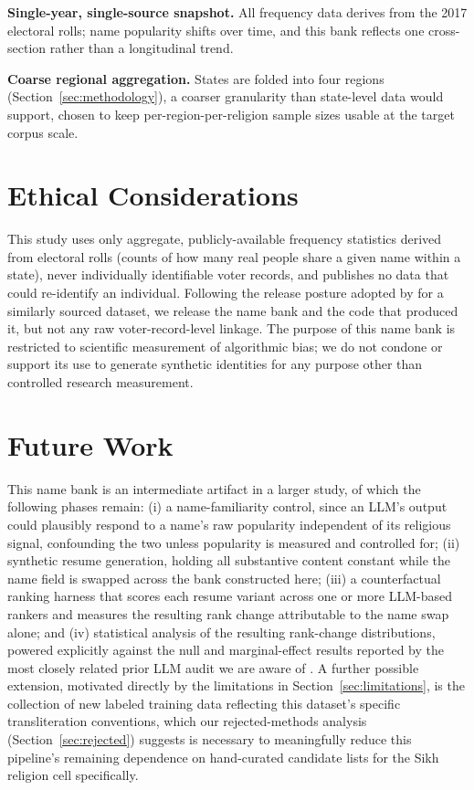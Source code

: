 \documentclass[11pt]{article}
\begin{document}
\textbf{Single-year, single-source snapshot.} All frequency data derives from the 2017 electoral rolls; name popularity shifts over time, and this bank reflects one cross-section rather than a longitudinal trend.

\textbf{Coarse regional aggregation.} States are folded into four regions (Section~\ref{sec:methodology}), a coarser granularity than state-level data would support, chosen to keep per-region-per-religion sample sizes usable at the target corpus scale.

\section{Ethical Considerations}
\label{sec:ethics}

This study uses only aggregate, publicly-available frequency statistics derived from electoral rolls (counts of how many real people share a given name within a state), never individually identifiable voter records, and publishes no data that could re-identify an individual. Following the release posture adopted by \citet{vahini2022} for a similarly sourced dataset, we release the name bank and the code that produced it, but not any raw voter-record-level linkage. The purpose of this name bank is restricted to scientific measurement of algorithmic bias; we do not condone or support its use to generate synthetic identities for any purpose other than controlled research measurement.

\section{Future Work}
\label{sec:future-work}

This name bank is an intermediate artifact in a larger study, of which the following phases remain: (i) a name-familiarity control, since an LLM's output could plausibly respond to a name's raw popularity independent of its religious signal, confounding the two unless popularity is measured and controlled for; (ii) synthetic resume generation, holding all substantive content constant while the name field is swapped across the bank constructed here; (iii) a counterfactual ranking harness that scores each resume variant across one or more LLM-based rankers and measures the resulting rank change attributable to the name swap alone; and (iv) statistical analysis of the resulting rank-change distributions, powered explicitly against the null and marginal-effect results reported by the most closely related prior LLM audit we are aware of \citep{invisiblefilters2025}. A further possible extension, motivated directly by the limitations in Section~\ref{sec:limitations}, is the collection of new labeled training data reflecting this dataset's specific transliteration conventions, which our rejected-methods analysis (Section~\ref{sec:rejected}) suggests is necessary to meaningfully reduce this pipeline's remaining dependence on hand-curated candidate lists for the Sikh religion cell specifically.
\end{document}
